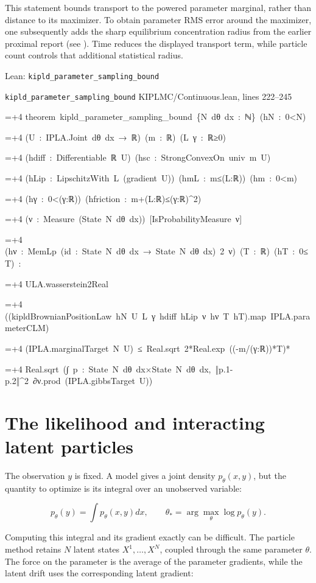 \documentclass[11pt,a4paper]{article}
\newlength{\leancharwidth}
\newenvironment{leancode}{\par\smallskip\begingroup\ttfamily\footnotesize\raggedright
  \settowidth{\leancharwidth}{M}\setlength{\parskip}{0pt}\setlength{\parindent}{0pt}
  \frenchspacing}{\par\endgroup\smallskip}
\newcommand{\leanline}[2]{\hangindent=\dimexpr#1\leancharwidth+4\leancharwidth\relax
  \hangafter=1\noindent\hspace*{#1\leancharwidth}#2\par}
\newcommand{\leansource}[1]{\par{\footnotesize\color{leanmuted}#1}\par}
\begin{document}
This statement bounds transport to the powered parameter marginal, rather than distance to its maximizer. To obtain parameter RMS error around the maximizer, one subsequently adds the sharp equilibrium concentration radius from the earlier proximal report (see \cite[Section~3.6.1]{LangevinLean2026Proximal}). Time reduces the displayed transport term, while particle count controls that additional statistical radius.

\begin{leanbox}{Lean: \texttt{kipld\_\allowbreak{}parameter\_\allowbreak{}sampling\_\allowbreak{}bound}}
\leansource{\texttt{kipld\_\allowbreak{}parameter\_\allowbreak{}sampling\_\allowbreak{}bound} \quad KIPLMC/\allowbreak{}Continuous.lean, lines 222–245}
\begin{leancode}
\leanline{0}{theorem\ kipld\_parameter\_sampling\_bound\ \{N\ dθ\ dx\ :\ ℕ\}\ (hN\ :\ 0<N)}
\leanline{4}{(U\ :\ IPLA.Joint\ dθ\ dx\ →\ ℝ)\ (m\ :\ ℝ)\ (L\ γ\ :\ ℝ≥0)}
\leanline{4}{(hdiff\ :\ Differentiable\ ℝ\ U)\ (hsc\ :\ StrongConvexOn\ univ\ m\ U)}
\leanline{4}{(hLip\ :\ LipschitzWith\ L\ (gradient\ U))\ (hmL\ :\ m≤(L:ℝ))\ (hm\ :\ 0<m)}
\leanline{4}{(hγ\ :\ 0<(γ:ℝ))\ (hfriction\ :\ m+(L:ℝ)≤(γ:ℝ)\textasciicircum{}2)}
\leanline{4}{(ν\ :\ Measure\ (State\ N\ dθ\ dx))\ [IsProbabilityMeasure\ ν]}
\leanline{4}{(hν\ :\ MemLp\ (id\ :\ State\ N\ dθ\ dx\ →\ State\ N\ dθ\ dx)\ 2\ ν)\ (T\ :\ ℝ)\ (hT\ :\ 0≤T)\ :}
\leanline{4}{ULA.wasserstein2Real}
\leanline{6}{((kipldBrownianPositionLaw\ hN\ U\ L\ γ\ hdiff\ hLip\ ν\ hν\ T\ hT).map\ IPLA.parameterCLM)}
\leanline{6}{(IPLA.marginalTarget\ N\ U)\ ≤\ Real.sqrt\ 2*Real.exp\ ((-m/(γ:ℝ))*T)*}
\leanline{8}{Real.sqrt\ (∫\ p\ :\ State\ N\ dθ\ dx×State\ N\ dθ\ dx,\ ‖p.1-p.2‖\textasciicircum{}2\ ∂ν.prod\ (IPLA.gibbsTarget\ U))}
\end{leancode}
\end{leanbox}

\section{\texorpdfstring{The likelihood and interacting latent particles}{The likelihood and interacting latent particles}}


The observation \(y\) is fixed. A model gives a joint density
\(p_\theta(x,y)\), but the quantity to optimize is its integral over an
unobserved variable:


\[p_\theta(y)=\int p_\theta(x,y)dx,
\qquad\theta_*=\arg\max_\theta\log p_\theta(y).\]


Computing this integral and its gradient exactly can be difficult. The
particle method retains \(N\) latent states \(X^1,\ldots,X^N\), coupled
through the same parameter \(\theta\). The force on the parameter is the
average of the parameter gradients, while the latent drift uses the corresponding
latent gradient:
\end{document}
